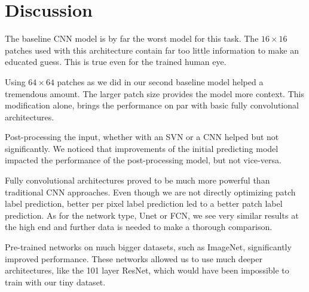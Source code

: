 \section{Discussion}
The baseline CNN model is by far the worst model for this task. The $16 \times 16$ patches used with this architecture contain far too little information to make an educated guess. This is true even for the trained human eye.

Using $64 \times 64$ patches as we did in our second baseline model helped a tremendous amount. The larger patch size provides the model more context. This modification alone, brings the performance on par with basic fully convolutional architectures.

Post-processing the input, whether with an SVN or a CNN helped but not significantly. We noticed that improvements of the initial predicting model impacted the performance of the post-processing model, but not vice-versa.

Fully convolutional architectures proved to be much more powerful than traditional CNN approaches. Even though we are not directly optimizing patch label prediction, better per pixel label prediction led to a better patch label prediction. As for the network type, Unet or FCN, we see very similar results at the high end and further data is needed to make a thorough comparison.

Pre-trained networks on much bigger datasets, such as ImageNet, significantly improved performance. These networks allowed us to use much deeper architectures, like the 101 layer ResNet, which would have been impossible to train with our tiny dataset.
